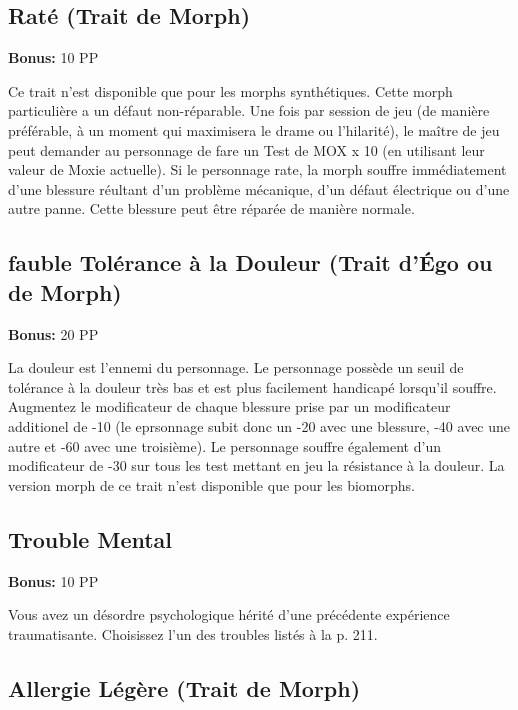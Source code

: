 \subsection{Raté (Trait de Morph)} \label{sec:traits-lemon} 

\textbf{Bonus:} 10 PP 

Ce trait n'est disponible que pour les morphs synthétiques. Cette morph particulière a un défaut non-réparable. Une fois par session de jeu (de manière préférable, à un moment qui maximisera le drame ou l'hilarité), le maître de jeu peut demander au personnage de fare un Test de MOX x 10 (en utilisant leur valeur de Moxie actuelle). Si le personnage rate, la morph souffre immédiatement d'une blessure réultant d'un problème mécanique, d'un défaut électrique ou d'une autre panne. Cette blessure peut être réparée de manière normale. 

\subsection{fauble Tolérance à la Douleur (Trait d'Égo ou de Morph)} \label{sec:traits-low-pain-tolerance} 

\textbf{Bonus:} 20 PP 

La douleur est l'ennemi du personnage. Le personnage possède un seuil de tolérance à la douleur très bas et est plus facilement handicapé lorsqu'il souffre. Augmentez le modificateur de chaque blessure prise par un modificateur additionel de -10 (le eprsonnage subit donc un -20 avec une blessure, -40 avec une autre et -60 avec une troisième). Le personnage souffre également d'un modificateur de -30 sur tous les test mettant en jeu la résistance à la douleur. La version morph de ce trait n'est disponible que pour les biomorphs. 

\subsection{Trouble Mental} \label{sec:traits-mental-disorder} 

\textbf{Bonus:} 10 PP 

Vous avez un désordre psychologique hérité d'une précédente expérience traumatisante. Choisissez l'un des troubles listés à la p. 211. 

\subsection{Allergie Légère (Trait de Morph)} \label{sec:traits-mild-allergy} 

